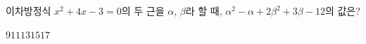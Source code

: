 이차방정식 $x^2+4x-3=0$의 두 근을 $\alpha$, $\beta$라 할 때, $\alpha^2-\alpha+2\beta^2+3\beta-12$의 값은?
\begin{choices32}{$9$}{$11$}{$13$}{$15$}{$17$}\end{choices32}
